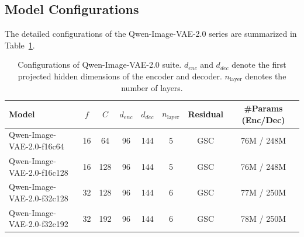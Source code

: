 \subsection{Model Configurations}

The detailed configurations of the Qwen-Image-VAE-2.0 series are summarized in Table~\ref{tab:vae_configs}.

\begin{table}[htbp]
\centering
\caption{Configurations of Qwen-Image-VAE-2.0 suite. $d_{enc}$ and $d_{dec}$ denote the first projected hidden dimensions of the encoder and decoder. $n_{\text{layer}}$ denotes the number of layers.}
\label{tab:vae_configs}
\begin{tabular}{lccccccc}
\toprule
\textbf{Model} & $f$ & $C$ & $d_{enc}$ & $d_{dec}$ & $n_{\text{layer}}$ & \textbf{Residual} & \textbf{\#Params (Enc/Dec)} \\ \midrule
Qwen-Image-VAE-2.0-f16c64  & 16 & 64  & 96 & 144 & 5 & GSC & 76M / 248M \\
Qwen-Image-VAE-2.0-f16c128  & 16 & 128  & 96 & 144 & 5 & GSC & 76M / 248M \\
Qwen-Image-VAE-2.0-f32c128 & 32 & 128 & 96 & 144 & 6 & GSC & 77M / 250M \\
Qwen-Image-VAE-2.0-f32c192 & 32 & 192 & 96 & 144 & 6 & GSC & 78M / 250M \\ \bottomrule
\end{tabular}
\end{table}
